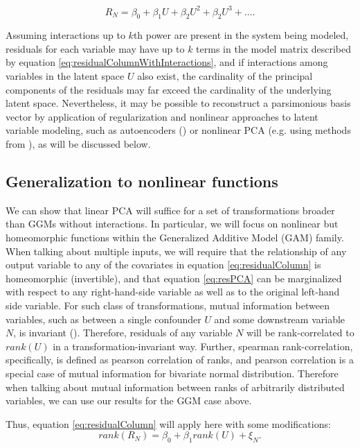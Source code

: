 \documentclass{article}
\begin{document}
\begin{equation}
R_N = \beta_0 + \beta_1 U + \beta_2 U^2 + \beta_2 U^3 + \dots.
\label{eq:residualColumnWithInteractions}
\end{equation}

Assuming interactions up to $k$th power are present in the system being modeled, residuals for each variable may have up to $k$ terms in the model matrix described by equation \ref{eq:residualColumnWithInteractions}, and if interactions among variables in the latent space $U$ also exist, the cardinality of the principal components of the residuals may far exceed the cardinality of the underlying latent space.  Nevertheless, it may be possible to reconstruct a parsimonious basis vector by application of regularization and nonlinear approaches to latent variable modeling, such as autoencoders (\cite{louizos_causal_2017}) or nonlinear PCA (e.g. using methods from \cite{karatzoglou_kernlab_2004}), as will be discussed below.

\subsection{Generalization to nonlinear functions}
We can show that linear PCA will suffice for a set of transformations broader than GGMs without interactions.  In particular, we will focus on nonlinear but homeomorphic functions within the Generalized Additive Model (GAM) family.  When talking about multiple inputs, we will require that the relationship of any output variable to any of the covariates in equation \ref{eq:residualColumn} is homeomorphic (invertible), and that equation \ref{eq:resPCA} can be marginalized with respect to any right-hand-side variable as well as to the original left-hand side variable.  For such class of transformations, mutual information between variables, such as between a single confounder $U$ and some downstream variable $N$, is invariant (\cite{kraskov_estimating_2004}).  Therefore, residuals of any variable $N$ will be rank-correlated to $rank(U)$ in a transformation-invariant way. Further, spearman rank-correlation, specifically, is defined as pearson correlation of ranks, and pearson correlation is a special case of mutual information for bivariate normal distribution.  Therefore when talking about mutual information between ranks of arbitrarily distributed variables, we can use our results for the GGM case above.

Thus, equation \ref{eq:residualColumn} will apply here with some modifications:
\begin{equation}
rank(R_N) = \beta_0 + \beta_1 rank(U) + \xi_N.
\label{eq:residualColumnRank}
\end{equation}
\end{document}
